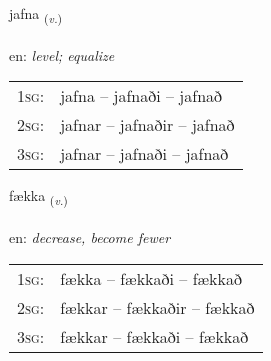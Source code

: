 \documentclass[frontgrid, backgrid]{flacards}\usepackage[]{graphicx}\usepackage[]{color}
\begin{document}
\renewcommand{\blhead}{\vskip5pt {\small\bfseries\footnotesize Sagnorð | Verb }}
\renewcommand{\bcfoot}{\vskip5pt \hspace{2pt}{\small\bfseries\footnotesize 2K}}


{jafna \small{\textsubscript{(\textit{v.})}} \\[1ex] %
\textphonetic{[japna]} \\
en: \emph{level; equalize} \\  [2ex]
\renewcommand*{\arraystretch}{0.8}
\begin{tabular}{p{1cm}l}
\textsc{1sg}: & jafna -- jafnaði -- jafnað \\ 
\textsc{2sg}: & jafnar -- jafnaðir -- jafnað \\ 
\textsc{3sg}: & jafnar -- jafnaði -- jafnað \\ 
\end{tabular}
}

\renewcommand{\flhead}{\vskip5pt \fboxsep=0pt {\small\bfseries\footnotesize Sagnorð | Verb}}
\renewcommand{\fcfoot}{\vskip5pt \fboxsep=0pt \hspace{2pt}{\small\bfseries\footnotesize 2K}}

\renewcommand{\blhead}{\vskip5pt {\small\bfseries\footnotesize Sagnorð | Verb }}
\renewcommand{\bcfoot}{\vskip5pt \hspace{2pt}{\small\bfseries\footnotesize 2K}}


{fækka \small{\textsubscript{(\textit{v.})}} \\[1ex] %
\textphonetic{[faihka]} \\
en: \emph{decrease, become fewer} \\  [2ex]
\renewcommand*{\arraystretch}{0.8}
\begin{tabular}{p{1cm}l}
\textsc{1sg}: & fækka -- fækkaði -- fækkað \\ 
\textsc{2sg}: & fækkar -- fækkaðir -- fækkað \\ 
\textsc{3sg}: & fækkar -- fækkaði -- fækkað \\ 
\end{tabular}
}
\end{document}
